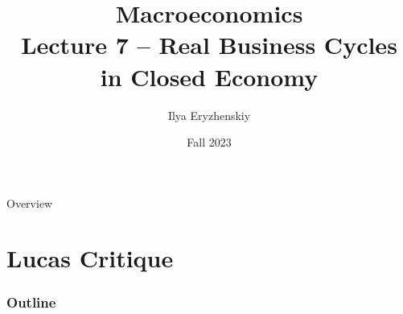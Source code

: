 \documentclass{beamer}
\title[PSME]{Macroeconomics\\ Lecture 7 -- Real Business Cycles in Closed Economy}
\author[I. Eryzhenskiy]{Ilya Eryzhenskiy}
\institute[BdF]{PSME Panth\'{e}on-Sorbonne Master in Economics}
\date[PSME macro]{Fall 2023}
\begin{document}
\begin{frame}
  \maketitle
\end{frame}

\begin{frame}{Overview}
  \tableofcontents
\end{frame}


\section{Lucas Critique}
\begin{frame}
\frametitle{Outline}
\tableofcontents[currentsection]
\end{frame}
\end{document}
